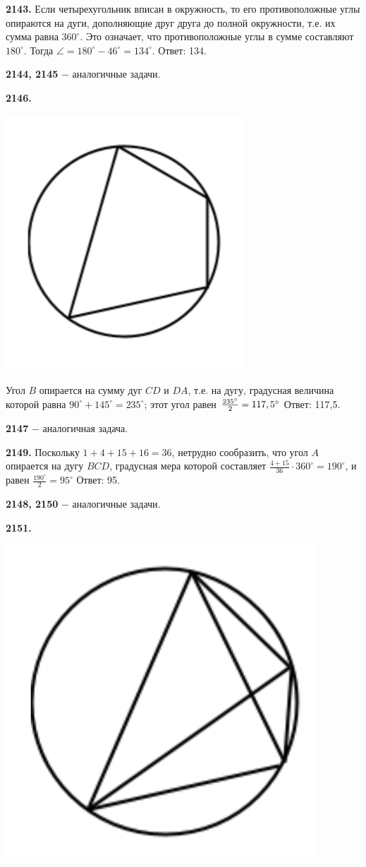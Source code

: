 \textbf{2143.} Если четырехугольник вписан в окружность, то его противоположные углы опираются на дуги, дополняющие друг друга до полной окружности, т.е. их сумма равна $360^\circ$. Это означает, что противоположные углы в сумме составляют $180^\circ$. Тогда $\angle = 180^\circ - 46^\circ=134^\circ$. \newline \null \hspace*{\fill} Ответ: 134.

\textbf{2144, 2145} $-$ аналогичные задачи.

\textbf{2146.}

{\centering \includegraphics[width=0.35\linewidth]{Geometry/Content/43.png}
	
}

Угол $B$ опирается на сумму дуг $CD$ и $DA$, т.е. на дугу, градусная величина которой равна $90^\circ+145^\circ=235^\circ$; этот угол равен $\linebreak \frac{235^\circ}{2}=117,5^\circ$ \newline \null \hspace*{\fill} Ответ: 117,5.

\textbf{2147} $-$ аналогичная задача.

\textbf{2149.}  Поскольку $1+4+15+16=36$, нетрудно сообразить, что угол $A$ опирается на дугу $BCD$, градусная мера которой составляет $\frac{4+15}{36}\cdot360^\circ=190^\circ$, и равен $\frac{190^\circ}{2}=95^\circ$ \newline \null \hspace*{\fill} Ответ: 95.

\textbf{2148, 2150} $-$ аналогичные задачи.

\textbf{2151.}

{\centering \includegraphics[width=0.35\linewidth]{Geometry/Content/44.png}
	
}

